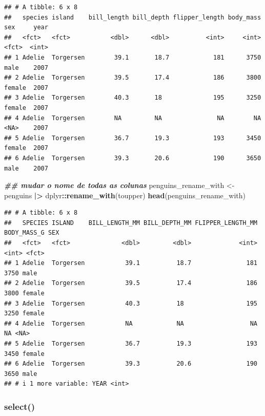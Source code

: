 \documentclass[
]{article}
\newenvironment{Shaded}{\begin{snugshade}}{\end{snugshade}}
\newcommand{\DocumentationTok}[1]{\textcolor[rgb]{0.56,0.35,0.01}{\textbf{\textit{#1}}}}
\newcommand{\FunctionTok}[1]{\textcolor[rgb]{0.13,0.29,0.53}{\textbf{#1}}}
\newcommand{\NormalTok}[1]{#1}
\newcommand{\OtherTok}[1]{\textcolor[rgb]{0.56,0.35,0.01}{#1}}
\newcommand{\SpecialCharTok}[1]{\textcolor[rgb]{0.81,0.36,0.00}{\textbf{#1}}}
\begin{document}
\begin{verbatim}
## # A tibble: 6 x 8
##   species island    bill_length bill_depth flipper_length body_mass sex     year
##   <fct>   <fct>           <dbl>      <dbl>          <int>     <int> <fct>  <int>
## 1 Adelie  Torgersen        39.1       18.7            181      3750 male    2007
## 2 Adelie  Torgersen        39.5       17.4            186      3800 female  2007
## 3 Adelie  Torgersen        40.3       18              195      3250 female  2007
## 4 Adelie  Torgersen        NA         NA               NA        NA <NA>    2007
## 5 Adelie  Torgersen        36.7       19.3            193      3450 female  2007
## 6 Adelie  Torgersen        39.3       20.6            190      3650 male    2007
\end{verbatim}

\begin{Shaded}
\begin{Highlighting}[]
\DocumentationTok{\#\# mudar o nome de todas as colunas}
\NormalTok{penguins\_rename\_with }\OtherTok{\textless{}{-}}\NormalTok{ penguins }\SpecialCharTok{|\textgreater{}} 
\NormalTok{    dplyr}\SpecialCharTok{::}\FunctionTok{rename\_with}\NormalTok{(toupper)}
\FunctionTok{head}\NormalTok{(penguins\_rename\_with)}
\end{Highlighting}
\end{Shaded}

\begin{verbatim}
## # A tibble: 6 x 8
##   SPECIES ISLAND    BILL_LENGTH_MM BILL_DEPTH_MM FLIPPER_LENGTH_MM BODY_MASS_G SEX   
##   <fct>   <fct>              <dbl>         <dbl>             <int>       <int> <fct> 
## 1 Adelie  Torgersen           39.1          18.7               181        3750 male  
## 2 Adelie  Torgersen           39.5          17.4               186        3800 female
## 3 Adelie  Torgersen           40.3          18                 195        3250 female
## 4 Adelie  Torgersen           NA            NA                  NA          NA <NA>  
## 5 Adelie  Torgersen           36.7          19.3               193        3450 female
## 6 Adelie  Torgersen           39.3          20.6               190        3650 male  
## # i 1 more variable: YEAR <int>
\end{verbatim}

\hypertarget{select}{%
\subsubsection{select()}\label{select}}
\end{document}

